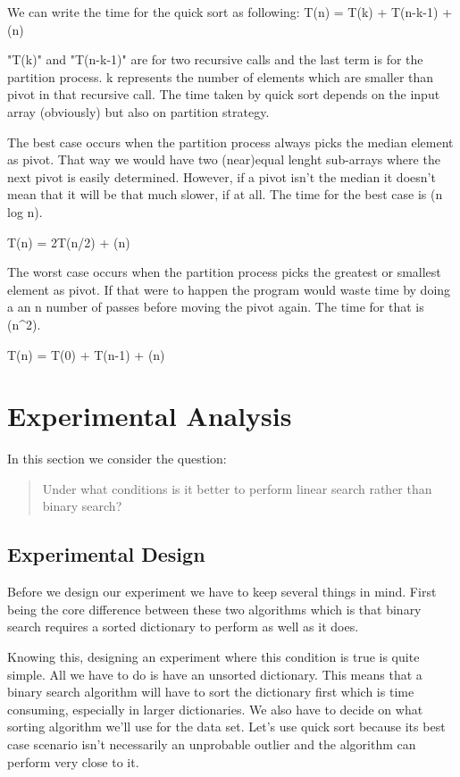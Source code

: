 \documentclass{article}
\begin{document}
We can write the time for the quick sort as following:
T(n) = T(k) + T(n-k-1) + \theta(n)

"T(k)" and "T(n-k-1)" are for two recursive calls and the last term is for the partition process. k represents the number of elements which are smaller than pivot in that recursive call. The time taken by quick sort depends on the input array (obviously) but also on partition strategy.

The best case occurs when the partition process always picks the median element as pivot. That way we would have two (near)equal lenght sub-arrays where the next pivot is easily determined. However, if a pivot isn't the median it doesn't mean that it will be that much slower, if at all. The time for the best case is \theta(n log n).

T(n) = 2T(n/2) + \theta(n)

The worst case occurs when the partition process picks the greatest or smallest element as pivot. If that were to happen the program would waste time by doing a an n number of passes before moving the pivot again. The time for that is \theta(n^2).

T(n) = T(0) + T(n-1) + \theta(n)

\section{Experimental Analysis}
\label{sec:initialExperiments}

In this section we consider the question:
	\begin{quote}
	Under what conditions is it better to perform linear search rather than binary search?
	\end{quote}

\subsection{Experimental Design}

Before we design our experiment we have to keep several things in mind. First being the core difference between these two algorithms which is that binary search requires a sorted dictionary to perform as well as it does.

Knowing this, designing an experiment where this condition is true is quite simple. All we have to do is have an unsorted dictionary. This means that a binary search algorithm will have to sort the dictionary first which is time consuming, especially in larger dictionaries. We also have to decide on what sorting algorithm we'll use for the data set. Let's use quick sort because its best case scenario isn't necessarily an unprobable outlier and the algorithm can perform very close to it.
\end{document}

